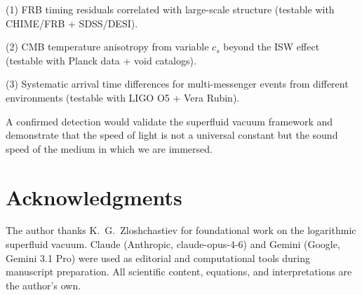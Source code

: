 \documentclass[12pt, a4paper]{article}
\begin{document}
(1) FRB timing residuals correlated with large-scale
structure (testable with CHIME/FRB + SDSS/DESI).

(2) CMB temperature anisotropy from variable $c_s$
beyond the ISW effect (testable with Planck data +
void catalogs).

(3) Systematic arrival time differences for
multi-messenger events from different environments
(testable with LIGO O5 + Vera Rubin).

A confirmed detection would validate the superfluid
vacuum framework and demonstrate that the speed of
light is not a universal constant but the sound speed
of the medium in which we are immersed.


\section*{Acknowledgments}

The author thanks K.~G.~Zloshchastiev for foundational
work on the logarithmic superfluid vacuum.
 Claude (Anthropic, claude-opus-4-6) and Gemini (Google, Gemini 3.1 Pro) were used as editorial and computational tools during manuscript preparation. All scientific content, equations, and
interpretations are the author's own.
\end{document}

